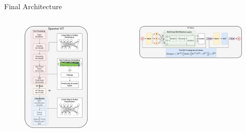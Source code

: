 \begin{frame}{Final Architecture}
\begin{columns}[c]
    \begin{figure}
        \centering
        \includegraphics[width=\textwidth]{figures/TransformerDiagrams/SpectralViT_Presentation.png}
    \end{figure}
    \begin{figure}
        \centering
        \includegraphics[width=\textwidth]{figures/TransformerDiagrams/Attention_Presentation.png}
    \end{figure}
\end{columns}
\end{frame}
